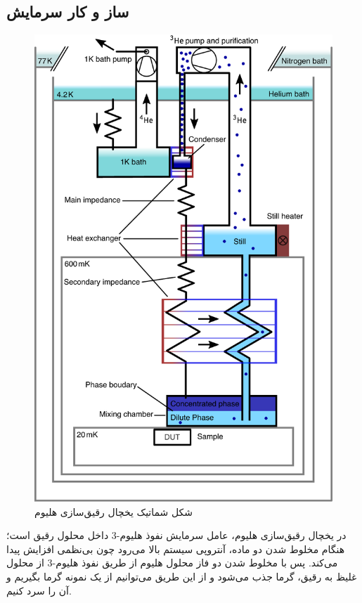 \documentclass[12pt,a4paper]{article}
\begin{document}
	\subsection{ساز و کار سرمایش}
	\begin{figure}
		\centering
		\includegraphics[width=0.9\linewidth]{cooler}
		\caption{شکل شماتیک یخچال رقیق‌سازی هلیوم}
		\label{fig4}
	\end{figure}
	در یخچال رقیق‌سازی هلیوم، عامل سرمایش نفوذ هلیوم-3 داخل محلول رقیق است؛ هنگام مخلوط شدن دو ماده، آنتروپی سیستم بالا می‌رود چون بی‌نظمی افزایش پیدا می‌کند.
	پس با مخلوط شدن دو فاز محلول هلیوم از طریق نفوذ هلیوم-3 از محلول غلیظ به رقیق، گرما جذب می‌شود و از این طریق می‌توانیم از یک نمونه گرما بگیریم و آن را سرد کنیم.
	
\end{document}

